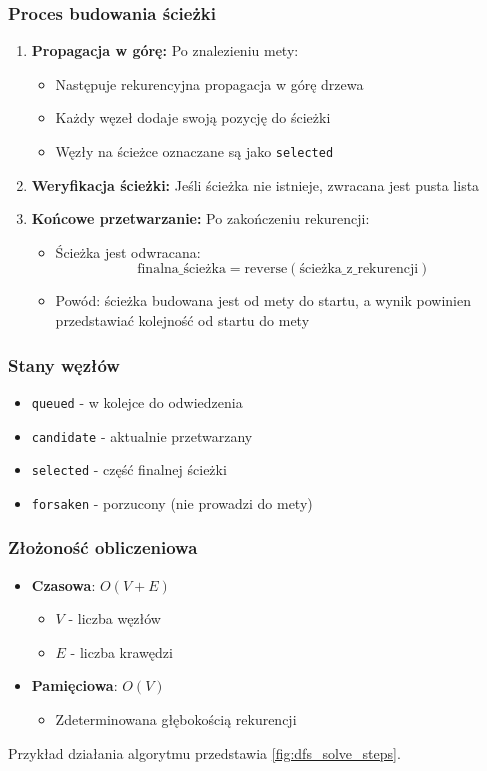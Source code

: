 \documentclass[../../../../doc.tex]{subfiles}
\begin{document}
\subsubsection{Proces budowania ścieżki}
\begin{enumerate}
  \item \textbf{Propagacja w górę:} Po znalezieniu mety:
        \begin{itemize}
          \item Następuje rekurencyjna propagacja w górę drzewa
          \item Każdy węzeł dodaje swoją pozycję do ścieżki
          \item Węzły na ścieżce oznaczane są jako \texttt{selected}
        \end{itemize}
  \item \textbf{Weryfikacja ścieżki:} Jeśli ścieżka nie istnieje, zwracana jest pusta lista
  \item \textbf{Końcowe przetwarzanie:} Po zakończeniu rekurencji:
        \begin{itemize}
          \item Ścieżka jest odwracana:
                \[ \text{finalna\_ścieżka} = \mathrm{reverse}(\text{ścieżka\_z\_rekurencji}) \]
          \item Powód: ścieżka budowana jest od mety do startu, a wynik powinien przedstawiać kolejność od startu do mety
        \end{itemize}
\end{enumerate}

\subsubsection{Stany węzłów}
\begin{itemize}
  \item \texttt{queued} - w kolejce do odwiedzenia
  \item \texttt{candidate} - aktualnie przetwarzany
  \item \texttt{selected} - część finalnej ścieżki
  \item \texttt{forsaken} - porzucony (nie prowadzi do mety)
\end{itemize}

\subsubsection{Złożoność obliczeniowa}
\begin{itemize}
  \item \textbf{Czasowa}: $O(V + E)$
        \begin{itemize}
          \item $V$ - liczba węzłów
          \item $E$ - liczba krawędzi
        \end{itemize}
  \item \textbf{Pamięciowa}: $O(V)$
        \begin{itemize}
          \item Zdeterminowana głębokością rekurencji
        \end{itemize}
\end{itemize}

Przykład działania algorytmu przedstawia \cref{fig:dfs_solve_steps}.

\begin{multicols}{2}
  
\end{multicols}
\end{document}
